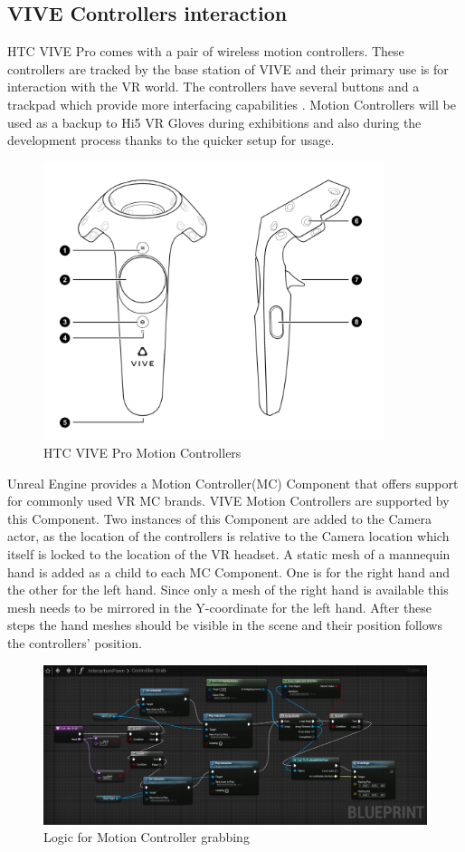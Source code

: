 \documentclass[12pt, a4paper,oneside, nocenter]{thesis}
\begin{document}
\subsection{VIVE Controllers interaction}
HTC VIVE Pro comes with a pair of wireless motion controllers. These controllers are tracked by the base station of VIVE and their primary use is for interaction with the VR world. The controllers have several buttons and a trackpad which provide more interfacing capabilities . Motion Controllers will be used as a backup to Hi5 VR Gloves during exhibitions and also during the development process thanks to the quicker setup for usage.
\begin{figure}[H]
	\includegraphics[height=230pt]{motion-controller}
	\caption{HTC VIVE Pro Motion Controllers}
	\label{fig:motion-controller}
\end{figure}
Unreal Engine provides a Motion Controller(MC) Component that offers support for commonly used VR MC brands. VIVE Motion Controllers are supported by this Component. Two instances of this Component are added to the Camera actor, as the location of the controllers is relative to the Camera location which itself is locked to the location of the VR headset. A static mesh of a mannequin hand is added as a child to each MC Component. One is for the right hand and the other for the left hand. Since only a mesh of the right hand is available this mesh needs to be mirrored in the Y-coordinate for the left hand. After these steps the hand meshes should be visible in the scene and their position follows the controllers' position.
\begin{figure}[H]
	\includegraphics[width=\textwidth]{grab-blueprint}
	\caption{Logic for Motion Controller grabbing}
	\label{fig:grab-blueprint}
\end{figure}
\end{document}
